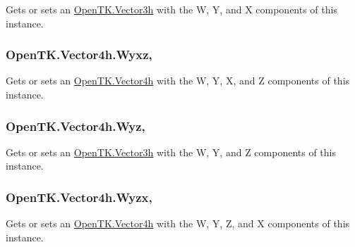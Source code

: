 Gets or sets an \hyperlink{struct_open_t_k_1_1_vector3h}{Open\-T\-K.\-Vector3h} with the W, Y, and X components of this instance. 

\hypertarget{struct_open_t_k_1_1_vector4h_ae6eef383b21d1a70b5db208a5d685b49}{
\subsubsection[{Wyxz}]{ Open\-T\-K.\-Vector4h.\-Wyxz\hspace{0.3cm}{\ttfamily [get]}, {\ttfamily [set]}}}\label{struct_open_t_k_1_1_vector4h_ae6eef383b21d1a70b5db208a5d685b49}


Gets or sets an \hyperlink{struct_open_t_k_1_1_vector4h}{Open\-T\-K.\-Vector4h} with the W, Y, X, and Z components of this instance. 

\hypertarget{struct_open_t_k_1_1_vector4h_a600016f1379837bbd42a3caa69eebe8e}{
\subsubsection[{Wyz}]{ Open\-T\-K.\-Vector4h.\-Wyz\hspace{0.3cm}{\ttfamily [get]}, {\ttfamily [set]}}}\label{struct_open_t_k_1_1_vector4h_a600016f1379837bbd42a3caa69eebe8e}


Gets or sets an \hyperlink{struct_open_t_k_1_1_vector3h}{Open\-T\-K.\-Vector3h} with the W, Y, and Z components of this instance. 

\hypertarget{struct_open_t_k_1_1_vector4h_a5cd2ba9a5b9fa265e988c7e1f6c35001}{
\subsubsection[{Wyzx}]{ Open\-T\-K.\-Vector4h.\-Wyzx\hspace{0.3cm}{\ttfamily [get]}, {\ttfamily [set]}}}\label{struct_open_t_k_1_1_vector4h_a5cd2ba9a5b9fa265e988c7e1f6c35001}


Gets or sets an \hyperlink{struct_open_t_k_1_1_vector4h}{Open\-T\-K.\-Vector4h} with the W, Y, Z, and X components of this instance. 

